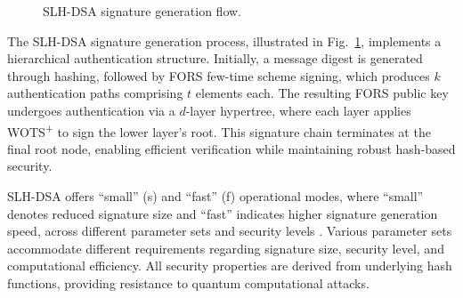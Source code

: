 \documentclass[journal]{IEEEtran}
\begin{document}
\begin{figure}[t]
  \centering
  \caption{SLH-DSA signature generation flow.}
  \label{fig:sphincs-process}
\end{figure}

The SLH-DSA signature generation process, illustrated in Fig.~\ref{fig:sphincs-process}, implements a hierarchical authentication structure. Initially, a message digest is generated through hashing, followed by FORS few-time scheme signing, which produces $k$ authentication paths comprising $t$ elements each. The resulting FORS public key undergoes authentication via a $d$-layer hypertree, where each layer applies WOTS\textsuperscript{+} to sign the lower layer's root. This signature chain terminates at the final root node, enabling efficient verification while maintaining robust hash-based security.

SLH-DSA offers ``small'' (s) and ``fast'' (f) operational modes, where ``small'' denotes reduced signature size and ``fast'' indicates higher signature generation speed, across different parameter sets and security levels \cite{Barker}. Various parameter sets accommodate different requirements regarding signature size, security level, and computational efficiency. All security properties are derived from underlying hash functions, providing resistance to quantum computational attacks.
\end{document}
